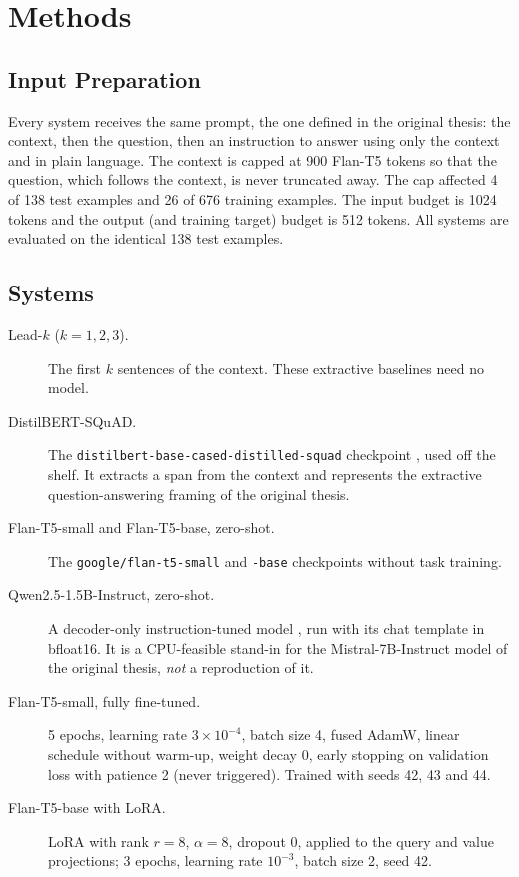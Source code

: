 
\chapter{Methods} %
\label{methods}

\section{Input Preparation}

Every system receives the same prompt, the one defined in the original thesis: the context, then the question, then an instruction to answer using only the context and in plain language. The context is capped at 900 Flan-T5 tokens so that the question, which follows the context, is never truncated away. The cap affected 4 of 138 test examples and 26 of 676 training examples. The input budget is 1024 tokens and the output (and training target) budget is 512 tokens. All systems are evaluated on the identical 138 test examples.

\section{Systems}

\begin{description}
    \item[Lead-$k$ ($k = 1, 2, 3$).] The first $k$ sentences of the context. These extractive baselines need no model.
    \item[DistilBERT-SQuAD.] The \nolinkurl{distilbert-base-cased-distilled-squad} checkpoint \parencite{sanh2019distilbert,rajpurkar2016squad}, used off the shelf. It extracts a span from the context and represents the extractive question-answering framing of the original thesis.
    \item[Flan-T5-small and Flan-T5-base, zero-shot.] The \texttt{google/flan-t5-small} and \texttt{-base} checkpoints \parencite{chung2024flan} without task training.
    \item[Qwen2.5-1.5B-Instruct, zero-shot.] A decoder-only instruction-tuned model \parencite{qwen2024qwen25}, run with its chat template in bfloat16. It is a CPU-feasible stand-in for the Mistral-7B-Instruct model of the original thesis, \emph{not} a reproduction of it.
    \item[Flan-T5-small, fully fine-tuned.] 5 epochs, learning rate $3\times10^{-4}$, batch size 4, fused AdamW, linear schedule without warm-up, weight decay 0, early stopping on validation loss with patience 2 (never triggered). Trained with seeds 42, 43 and 44.
    \item[Flan-T5-base with LoRA.] LoRA \parencite{hu2022lora} with rank $r = 8$, $\alpha = 8$, dropout 0, applied to the query and value projections; 3 epochs, learning rate $10^{-3}$, batch size 2, seed 42.
\end{description}

